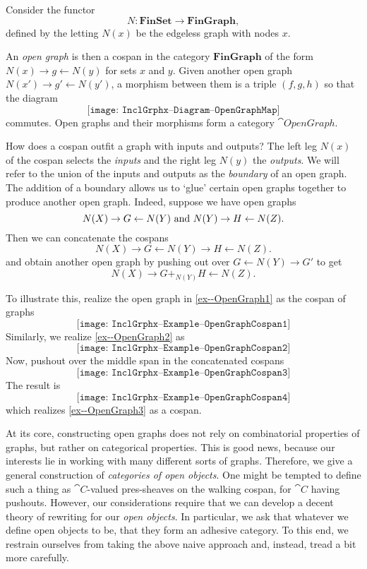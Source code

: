 Consider the functor
\begin{equation}
\label{eq--FunctorN}
	N \colon \mathbf{FinSet} \to \mathbf{FinGraph},
\end{equation}
defined by the letting 
$N(x)$ be the edgeless graph 
with nodes $x$.  

\begin{df} %
	\label{df--OpenGraph}
	An \emph{open graph} is then 
	a cospan in the category 
	$\mathbf{FinGraph}$ 
	of the form 
	$N(x) \to g \gets N(y)$ 
	for sets $x$ and $y$.
	Given another open graph
	$N(x') \to g' \gets N(y')$, 
	a morphism between them
	is a triple $(f,g,h)$ so that
	the diagram
	\[
	\texttt{[image: InclGrphx--Diagram--OpenGraphMap]}
	\]
	commutes.
	Open graphs and their morphisms
	form a category $\cat{OpenGraph}$.	
\end{df}

How does a cospan outfit a graph
with inputs and outputs?
The left leg $N(x)$ of the cospan 
selects the \emph{inputs} and 
the right leg $N(y)$ the \emph{outputs}.  
We will refer to the union
of the inputs and outputs as the
\emph{boundary} of an open graph.
The addition of a boundary allows us to 
`glue' certain open graphs together
to produce another open graph.
Indeed, suppose we have open graphs 
\[
	N ( X ) \to G \gets N ( Y )
	\text{ and }
	N ( Y ) \to H \gets N ( Z ).
\]
Then we can concatenate the cospans 
\[
	N(X) \to G \gets N(Y) \to H \gets N(Z). 
\] 
and obtain another open graph
by pushing out over 
$G \gets N(Y) \to G'$ to get 
\[
	N(X) \to G +_{ N ( Y ) } H \gets N(Z).
\] 

To illustrate this, 
realize the open graph in \eqref{ex--OpenGraph1}
as the cospan of graphs
\begin{equation}
\label{ex--OpenGraphCospan1}
	\texttt{[image: InclGrphx--Example--OpenGraphCospan1]}
\end{equation}
Similarly, we realize \eqref{ex--OpenGraph2} as 
\[
	\texttt{[image: InclGrphx--Example--OpenGraphCospan2]}
\]
Now, pushout over
the middle span in the concatenated
cospans
\[
	\texttt{[image: InclGrphx--Example--OpenGraphCospan3]}
\]
The result is
\[
	\texttt{[image: InclGrphx--Example--OpenGraphCospan4]}
\]
which realizes 
\eqref{ex--OpenGraph3} 
as a cospan.


At its core, constructing open graphs
does not rely on combinatorial properties
of graphs, but rather on categorical properties.  
This is good news, because our interests
lie in working with many different sorts of graphs. 
Therefore, we give a general construction
of \emph{categories of open objects}.  
One might be tempted to define such a thing
as $\cat{C}$-valued pres-sheaves on 
the walking cospan, for $\cat{C}$ having pushouts.
However, our considerations require that
we can develop a decent theory of rewriting
for our \emph{open objects}. 
In particular, we ask that whatever 
we define open objects to be, that they form
an adhesive category.  To this end,
we restrain ourselves from taking
the above naive approach and, instead,
tread a bit more carefully. 

